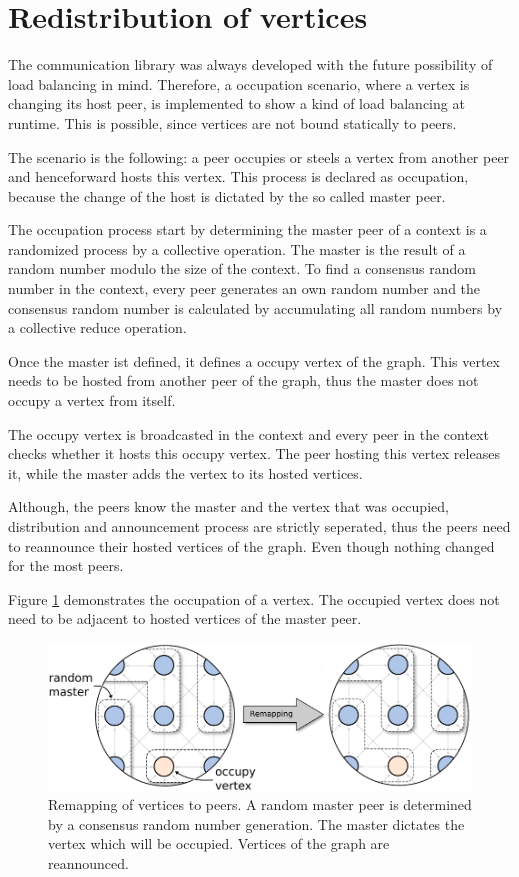 \section{Redistribution of vertices}

  The communication library was always developed with the future
  possibility of load balancing in mind.  Therefore, a occupation
  scenario, where a vertex is changing its host peer, is implemented
  to show a kind of load balancing at runtime. This is possible, since
  vertices are not bound statically to peers.

  The scenario is the following: a peer occupies or steels a vertex
  from another peer and henceforward hosts this vertex.  This process
  is declared as occupation, because the change of the host is
  dictated by the so called master peer.

  The occupation process start by determining the master peer of a
  context is a randomized process by a collective operation. The
  master is the result of a random number modulo the size of the
  context. To find a consensus random number in the context, every
  peer generates an own random number and the consensus random number
  is calculated by accumulating all random numbers by a collective
  reduce operation.

  Once the master ist defined, it defines a occupy vertex of the
  graph. This vertex needs to be hosted from another peer of the
  graph, thus the master does not occupy a vertex from itself.

  The occupy vertex is broadcasted in the context and every peer in
  the context checks whether it hosts this occupy vertex. The peer
  hosting this vertex releases it, while the master adds the vertex
  to its hosted vertices.

  Although, the peers know the master and the vertex that was
  occupied, distribution and announcement process are strictly
  seperated, thus the peers need to reannounce their hosted vertices
  of the graph. Even though nothing changed for the most peers.


  Figure \ref{fig:gol_remapping} demonstrates the occupation of a vertex.
  The occupied vertex does not need to be adjacent to hosted vertices
  of the master peer.

  \begin{figure}[H]
    \centering
    \includegraphics[width=\textwidth]{graphics/40_gol_remapping}
    \caption{Remapping of vertices to peers. A random master peer is
      determined by a consensus random number generation. The master
      dictates the vertex which will be occupied. Vertices of the
      graph are reannounced.}
    \label{fig:gol_remapping}
  \end{figure}



